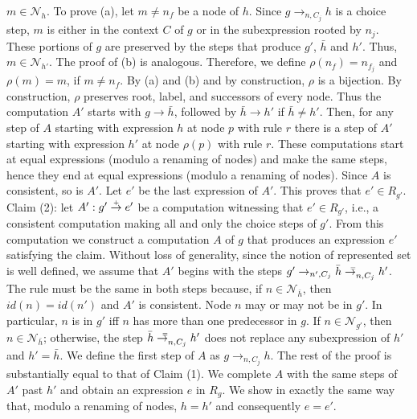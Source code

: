 \documentclass{mytlp}
\newcommand{\nodes}{\ensuremath{\mathcal{N}}}
\newcommand{\toplus}{\buildrel \mbox{\rm \tiny +} \over \to}
\newcommand{\toequal}{\to^{\llap{\raisebox{.3ex}{\tiny $=$}}}}
\newcommand{\rep}{R}
\begin{document}
{{$m \in \nodes_h$.
To prove (a), let $m \ne n_f$ be a node of $h$.
Since $g \to_{n,C_j} h$ is a choice step,
$m$ is either in the context $C$ of $g$
or in the subexpression rooted by $n_j$.
These portions of $g$ are preserved by the steps
that produce $g'$, $\bar h$ and $h'$.
Thus, $m \in \nodes_{h'}$.
The proof of (b) is analogous.
Therefore, we define $\rho(n_f)=n_{f_j}$
and $\rho(m)=m$, if $m \ne n_f$.
By (a) and (b) and by construction, $\rho$ is a bijection.
By construction, $\rho$ preserves root,
label, and successors of every node.
Thus the computation $A'$ starts with $g \to \bar h$,
followed by $\bar h \to h'$ if $\bar h \ne h'$.
Then, for any step of $A$ starting with expression $h$ at node
$p$ with rule $r$ there is a step of $A'$ starting with expression $h'$
at node $\rho(p)$ with rule $r$.
These computations start at equal expressions
(modulo a renaming of nodes)
and make the same steps, hence
they end at equal expressions (modulo a renaming of nodes).
Since $A$ is consistent, so is $A'$.
Let $e'$ be the last expression of $A'$.
This proves that $e' \in \rep_{g'}$.
\\[1ex]
Claim (2):
let $A': g' \toplus e'$ be a computation
witnessing that $e' \in \rep_{g'}$, i.e., a consistent
computation making all and only the choice steps of $g'$.
From this computation we construct a computation $A$ of $g$
that produces an expression $e'$ satisfying the claim.
Without loss of generality, since the notion of represented set
is well defined, we assume that $A'$ begins with the steps
$g' \to_{n',C_j} \bar h \toequal_{n,C_j} h'$.
The rule must be the same in both steps because,
if $n \in \nodes_{\bar h}$, then
$id(n)=id(n')$ and $A'$ is consistent.
Node $n$ may or may not be in $g'$.
In particular, $n$ is in $g'$ iff $n$ has more
than one predecessor in $g$.  
If $n \in \nodes_{g'}$, then $n \in \nodes_{\bar h}$;
otherwise, the step $\bar h \toequal_{n,C_j} h'$ does not
replace any subexpression of $h'$ and $h'= \bar h$.
We define the first step of $A$ as $g \to_{n,C_j} h$.
The rest of the proof is substantially equal to that of Claim (1).  
We complete $A$ with the same steps of $A'$ past $h'$
and obtain an expression $e$ in $\rep_{g}$.
We show in exactly the same way that,
modulo a renaming of nodes,
$h = h'$ and consequently $e = e'$.
}
}

\lemmainvarpulltab
\end{document}
